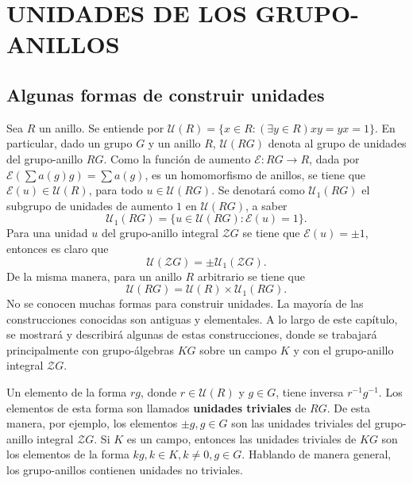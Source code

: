 \chapter{UNIDADES DE LOS GRUPO-ANILLOS}
\section{\quad Algunas formas de construir unidades}
Sea $R$ un anillo. Se entiende por $\mathcal{U}(R) = \{x \in R \colon (\exists y \in R)xy=yx=1\}$. 
En particular, dado un grupo $G$ y un anillo $R$, $\mathcal{U}(RG)$ denota al grupo de unidades del grupo-anillo $RG$. Como la función de aumento $\mathcal{E} \colon RG \to R$, dada por $\mathcal{E} \left( \sum a(g)g \right) = \sum a(g)$, es un homomorfismo de anillos, se tiene que $\mathcal{E}(u) \in \mathcal{U}(R)$, para todo $u \in \mathcal{U}(RG).$ Se denotará como $\mathcal{U}_1(RG)$ el subgrupo de unidades de aumento $1$ en $\mathcal{U}(RG)$, a saber
\[\mathcal{U}_1(RG) = \{u \in \mathcal{U}(RG) \colon \mathcal{E}(u) = 1 \}.\] Para una unidad $u$ del grupo-anillo integral $\mathcal{Z}G$ se tiene que $\mathcal{E}(u) = \pm1$, entonces es claro que \[ \mathcal{U}(\mathcal{Z}G) = \pm \mathcal U_1(\mathcal{Z}G) .\]
De la misma manera, para un anillo $R$ arbitrario se tiene que \[ \mathcal{U}(RG) = \mathcal{U}(R) \times \mathcal{U}_1(RG). \]
No se conocen muchas formas para construir unidades. La mayoría de las construcciones conocidas son antiguas y elementales. A lo largo de este capítulo, se mostrará y describirá algunas de estas construcciones, donde se trabajará principalmente con grupo-álgebras $KG$ sobre un campo $K$ y con el grupo-anillo integral $\mathcal{Z}G$.
\begin{ejemplo}
Un elemento de la forma $rg$, donde $r \in \mathcal{U}(R)$ y $g \in G$, tiene inversa $r^{-1}g^{-1}$. Los elementos de esta forma son llamados \textbf{unidades triviales} de $RG$. De esta manera, por ejemplo, los elementos $\pm g, g \in G$ son las unidades triviales del grupo-anillo integral $\mathcal{Z}G$. Si $K$ es un campo, entonces las unidades triviales de $KG$ son los elementos de la forma $kg, k \in K, k \neq 0, g \in G$. Hablando de manera general, los grupo-anillos contienen unidades no triviales.
\end{ejemplo}
